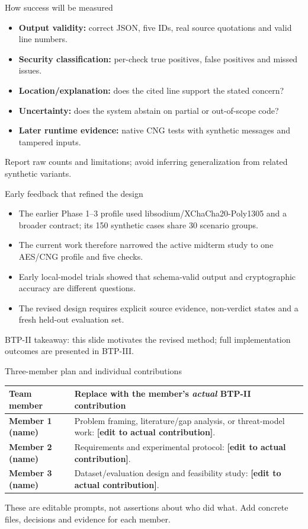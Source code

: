 \documentclass[aspectratio=169,10pt]{beamer}
\newcommand{\mone}{Member 1 (name)}
\newcommand{\mtwo}{Member 2 (name)}
\newcommand{\mthree}{Member 3 (name)}
\begin{document}
\begin{frame}{How success will be measured}
\begin{itemize}
\item \textbf{Output validity:} correct JSON, five IDs, real source quotations and valid line numbers.
\item \textbf{Security classification:} per-check true positives, false positives and missed issues.
\item \textbf{Location/explanation:} does the cited line support the stated concern?
\item \textbf{Uncertainty:} does the system abstain on partial or out-of-scope code?
\item \textbf{Later runtime evidence:} native CNG tests with synthetic messages and tampered inputs.
\end{itemize}
\vspace{0.3em}
\alert{Report raw counts and limitations; avoid inferring generalization from related synthetic variants.}
\end{frame}

\begin{frame}{Early feedback that refined the design}
\begin{itemize}
\item The earlier Phase 1--3 profile used libsodium/XChaCha20-Poly1305 and a broader contract; its 150 synthetic cases share 30 scenario groups.
\item The current work therefore narrowed the active midterm study to one AES/CNG profile and five checks.
\item Early local-model trials showed that schema-valid output and cryptographic accuracy are different questions.
\item The revised design requires explicit source evidence, non-verdict states and a fresh held-out evaluation set.
\end{itemize}
\vfill
{\scriptsize BTP-II takeaway: this slide motivates the revised method; full implementation outcomes are presented in BTP-III.}
\end{frame}

\begin{frame}{Three-member plan and individual contributions}
\small
\begin{tabularx}{\textwidth}{>{\bfseries}p{2.7cm}X}
\toprule
Team member & Replace with the member's \emph{actual} BTP-II contribution \\
\midrule
\mone & Problem framing, literature/gap analysis, or threat-model work: \textbf{[edit to actual contribution]}. \\
\mtwo & Requirements and experimental protocol: \textbf{[edit to actual contribution]}. \\
\mthree & Dataset/evaluation design and feasibility study: \textbf{[edit to actual contribution]}. \\
\bottomrule
\end{tabularx}
\vspace{0.6em}
{\scriptsize These are editable prompts, not assertions about who did what. Add concrete files, decisions and evidence for each member.}
\end{frame}
\end{document}

